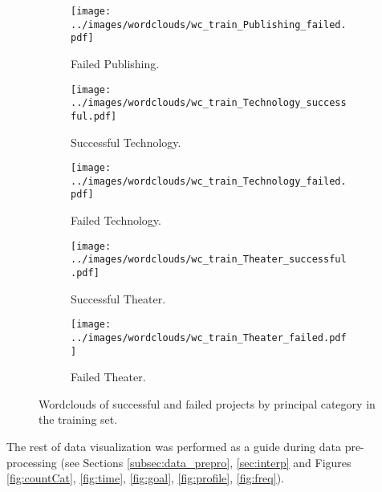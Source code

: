 \documentclass{article}
\begin{document}
\begin{itemize}
\begin{figure}
  \begin{subfigure}[m']{0.2\linewidth}
    \centering\texttt{[image: ../images/wordclouds/wc\_train\_Publishing\_failed.pdf]}
    \caption{Failed Publishing.}
    \label{fig:Publishing_f}
  \end{subfigure}
    \begin{subfigure}[n]{0.2\linewidth}
    \centering\texttt{[image: ../images/wordclouds/wc\_train\_Technology\_successful.pdf]}
    \caption{Successful Technology.}
    \label{fig:Technology_s}
  \end{subfigure} 
  \begin{subfigure}[n']{0.2\linewidth}
    \centering\texttt{[image: ../images/wordclouds/wc\_train\_Technology\_failed.pdf]}
    \caption{Failed Technology.}
    \label{fig:Technology_f}
  \end{subfigure}
    \begin{subfigure}[o]{0.2\linewidth}
    \centering\texttt{[image: ../images/wordclouds/wc\_train\_Theater\_successful.pdf]}
    \caption{Successful Theater.}
    \label{fig:Theater_s}
  \end{subfigure} 
  \begin{subfigure}[o']{0.2\linewidth}
    \centering\texttt{[image: ../images/wordclouds/wc\_train\_Theater\_failed.pdf]}
    \caption{Failed Theater.}
    \label{fig:Theater_f}
  \end{subfigure}

\caption{Wordclouds of successful and failed projects by principal category in the training set.}
\label{fig:wordclouds}
\end{figure}

The rest of data visualization was performed as a guide during data pre-processing (see Sections \ref{subsec:data_prepro}, \ref{sec:interp} and Figures \ref{fig:countCat}, \ref{fig:time}, \ref{fig:goal},  \ref{fig:profile}, \ref{fig:freq}).

\end{itemize}
\end{document}
